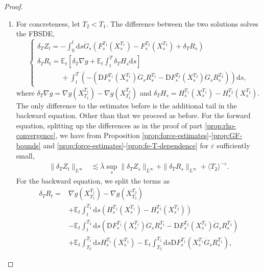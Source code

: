 \documentclass[11pt, a4paper]{scrartcl}
\numberwithin{equation}{section}
\theoremstyle{plain}
\theoremstyle{remark}
\newcommand{\mathD}{\mathrm{D}}
\newcommand{\mathd}{\mathrm{d}}
\newenvironment{enumeratealpha}{\begin{enumerate}[a{\textup{)}}] }{\end{enumerate}}
\begin{document}
\begin{proof}
\begin{enumeratealpha}
		\item For concreteness, let $T_2 < T_1$. The difference between the two
		solutions solves the FBSDE,
		\[ \begin{cases}
				\delta_T Z_t = - \int_0^t \mathd s \dot{G}_s (F_s^{T_1} (X^{T_1}_s) -
				F_s^{T_2} (X^{T_2}_s) + \delta_T R_s)            \\
				\delta_T R_t =\mathbb{E}_t \left[ \delta_T \nabla g +
				\mathbb{E}_t\int_t^T \delta_T H_s\mathd s\right] \\
				\phantom{\delta_T R_t =}+\int_t^T\left( -( \mathD F_s^{T_1} \left(
				X_s^{T_1} \right)  \dot{G}_s R_s^{T_1} - \mathD F_s^{T_2} (X_s^{T_2})
				\dot{G}_s R_s^{T_2}) \right) \mathd s,
			\end{cases} \]
		where $\delta_T \nabla g = \nabla g (X^{T_1}_{T_1}) - \nabla g (X^{T_2}_{T_2})$
		and $\delta_T H_s = H_s^{T_1} (X^{T_1}_s) - H_s^{T_2} (X^{T_2}_s)$. The
		only difference to the estimates before is the additional tail in the
		backward equation. Other than that we proceed as before. For the forward
		equation, splitting up the differences as in the proof of part
		\ref{prop:rho-convergence}, we have from Proposition
		\ref{prop:force-estimates}-\ref{prop:GF-bounds}
		and \ref{prop:force-estimates}-\ref{prop:fe-T-dependence} for $\varepsilon$ sufficiently small,
		\[ \begin{aligned}
				\| \delta_T Z_t \|_{L^{\infty}} & \lesssim  \bar{\lambda} \sup_s \|
				\delta_T Z_s \|_{L^{\infty}} + \| \delta_T R_s \|_{L^{\infty}} +
				\langle T_2 \rangle^{- \varepsilon}.
			\end{aligned} \]
		For the backward equation, we split the terms as
		\[ \begin{aligned}
				\delta_T R_t = & \nabla g (X^{T_1}_{T_1}) - \nabla g
				(X^{T_2}_{T_2})                                                                \\
				               & +\mathbb{E}_t  \int_t^{T_2} \mathd s (H_s^{T_1} (X^{T_1}_s) -
				H_s^{T_2} (X^{T_2}_s))                                                         \\
				               & -\mathbb{E}_t  \int_t^{T_2} \mathd s (\mathD
				F_s^{T_1} (X_s^{T_1})  \dot{G}_s R_s^{T_1} - \mathD F_s^{T_2}
				(X_s^{T_2})  \dot{G}_s R_s^{T_2})                                              \\
				               & +\mathbb{E}_t  \int_{T_2}^{T_1} \mathd s H_s^{T_1}
				(X^{T_1}_s) -\mathbb{E}_t  \int_{T_2}^{T_1} \mathd s \mathD
				F_s^{T_1} (X_s^{T_1}  \dot{G}_s R_s^{T_1}),
			\end{aligned} \]

\end{enumeratealpha}
\end{proof}
\end{document}
